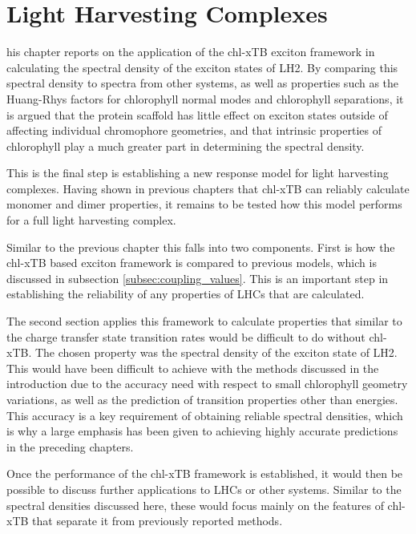 %
%
\let\textcircled=\pgftextcircled
\chapter{Light Harvesting Complexes}
\label{chap:LH2}

his chapter reports on the application of the chl-xTB exciton framework
in calculating the spectral density of the exciton states of LH2. By comparing this
spectral density to spectra from other systems, as well as properties such as the
Huang-Rhys factors for chlorophyll normal modes and chlorophyll separations,
it is argued that the protein scaffold has little effect on exciton states outside
of affecting individual chromophore geometries, and that intrinsic properties of
chlorophyll play a much greater part in determining the spectral density.

This is the final step is establishing a new response model for light harvesting
complexes. Having shown in previous chapters that chl-xTB can reliably calculate 
monomer and dimer properties, it remains to be tested how this model performs for
a full light harvesting complex.

Similar to the previous chapter this falls into two components. First is how the
chl-xTB based exciton framework is compared to previous models, which is discussed
in subsection \ref{subsec:coupling_values}. This is an important step in establishing
the reliability of any properties of LHCs that are calculated.

The second section applies this framework to calculate properties that similar to 
the charge transfer state transition rates would be difficult to do without chl-xTB.
The chosen property was the spectral density of the exciton state of LH2. This would
have been difficult to achieve with the methods discussed in the introduction due
to the accuracy need with respect to small chlorophyll geometry variations, as well
as the prediction of transition properties other than \Qy energies. This accuracy
is a key requirement of obtaining reliable spectral densities, which is why a large
emphasis has been given to achieving highly accurate predictions in the preceding
chapters.

Once the performance of the chl-xTB framework is established, it would then be possible
to discuss further applications to LHCs or other systems. Similar to the spectral
densities discussed here, these would focus mainly on the features of chl-xTB that
separate it from previously reported methods.

